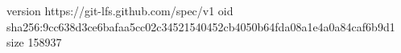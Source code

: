 version https://git-lfs.github.com/spec/v1
oid sha256:9cc638d3ce6bafaa5cc02c34521540452cb4050b64fda08a1e4a0a84caf6b9d1
size 158937
